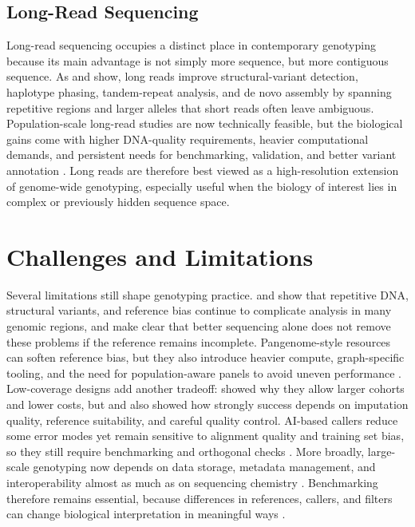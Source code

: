 \documentclass{article}
\begin{document}
\subsection{Long-Read Sequencing}
Long-read sequencing occupies a distinct place in contemporary genotyping because its main advantage is not simply more sequence, but more contiguous sequence. As \textcite{de2021towards} and \textcite{mahmoud2025hitchhiker} show, long reads improve structural-variant detection, haplotype phasing, tandem-repeat analysis, and de novo assembly by spanning repetitive regions and larger alleles that short reads often leave ambiguous. Population-scale long-read studies are now technically feasible, but the biological gains come with higher DNA-quality requirements, heavier computational demands, and persistent needs for benchmarking, validation, and better variant annotation \parencite{morton2020challenges,hemker2026manual,luan2020evaluating}. Long reads are therefore best viewed as a high-resolution extension of genome-wide genotyping, especially useful when the biology of interest lies in complex or previously hidden sequence space.

\section{Challenges and Limitations}
Several limitations still shape genotyping practice. \textcite{morton2020challenges} and \textcite{hemker2026manual} show that repetitive DNA, structural variants, and reference bias continue to complicate analysis in many genomic regions, and \textcite{de2024revamped} make clear that better sequencing alone does not remove these problems if the reference remains incomplete. Pangenome-style resources can soften reference bias, but they also introduce heavier compute, graph-specific tooling, and the need for population-aware panels to avoid uneven performance \parencite{de2021towards,mahmoud2025hitchhiker}. Low-coverage designs add another tradeoff: \textcite{lou2021beginner} showed why they allow larger cohorts and lower costs, but \textcite{deng2022comparison} and \textcite{liu2024accurate} also showed how strongly success depends on imputation quality, reference suitability, and careful quality control. AI-based callers reduce some error modes yet remain sensitive to alignment quality and training set bias, so they still require benchmarking and orthogonal checks \parencite{abdelwahab2025artificial,majidian2023genomic,guille2025benchmarking}. More broadly, large-scale genotyping now depends on data storage, metadata management, and interoperability almost as much as on sequencing chemistry \parencite{vedi20232022}. Benchmarking therefore remains essential, because differences in references, callers, and filters can change biological interpretation in meaningful ways \parencite{zverinova2022variant,barbitoff2022systematic,pei2021benchmarking,pinto2026variant,majidian2023genomic}.
\end{document}
